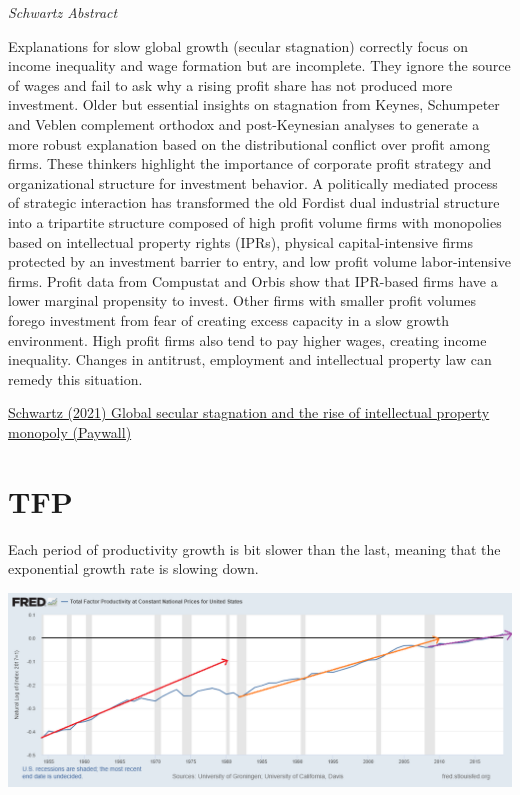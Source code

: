 \documentclass[
]{book}
\begin{document}
\emph{Schwartz Abstract}

Explanations for slow global growth (secular stagnation) correctly focus on income inequality and wage formation but are incomplete. They ignore the source of wages and fail to ask why a rising profit share has not produced more investment. Older but essential insights on stagnation from Keynes, Schumpeter and Veblen complement orthodox and post-Keynesian analyses to generate a more robust explanation based on the distributional conflict over profit among firms. These thinkers highlight the importance of corporate profit strategy and organizational structure for investment behavior. A politically mediated process of strategic interaction has transformed the old Fordist dual industrial structure into a tripartite structure composed of high profit volume firms with monopolies based on intellectual property rights (IPRs), physical capital-intensive firms protected by an investment barrier to entry, and low profit volume labor-intensive firms. Profit data from Compustat and Orbis show that IPR-based firms have a lower marginal propensity to invest. Other firms with smaller profit volumes forego investment from fear of creating excess capacity in a slow growth environment. High profit firms also tend to pay higher wages, creating income inequality. Changes in antitrust, employment and intellectual property law can remedy this situation.

\href{https://www.tandfonline.com/doi/abs/10.1080/09692290.2021.1918745}{Schwartz (2021) Global secular stagnation and the rise of intellectual property monopoly (Paywall)}

\hypertarget{tfp}{%
\section{TFP}\label{tfp}}

Each period of productivity growth is bit slower than the last,
meaning that the exponential growth rate is slowing down.

\includegraphics{fig/TFP_US_Log.png}
\end{document}
